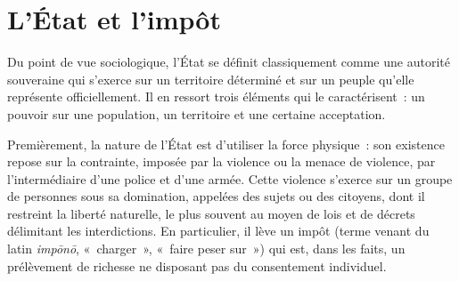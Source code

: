 %

\section*{L'État et l'impôt}

Du point de vue sociologique, l'État se définit classiquement comme une autorité souveraine qui s'exerce sur un territoire déterminé et sur un peuple qu'elle représente officiellement. Il en ressort trois éléments qui le caractérisent~: un pouvoir sur une population, un territoire et une certaine acceptation.

Premièrement, la nature de l'État est d'utiliser la force physique~: son existence repose sur la contrainte, imposée par la violence ou la menace de violence, par l'intermédiaire d'une police et d'une armée. Cette violence s'exerce sur un groupe de personnes sous sa domination, appelées des sujets ou des citoyens, dont il restreint la liberté naturelle, le plus souvent au moyen de lois et de décrets délimitant les interdictions. En particulier, il lève un impôt (terme venant du latin \emph{impōnō}, «~charger~», «~faire peser sur~») qui est, dans les faits, un prélèvement de richesse ne disposant pas du consentement individuel. %

